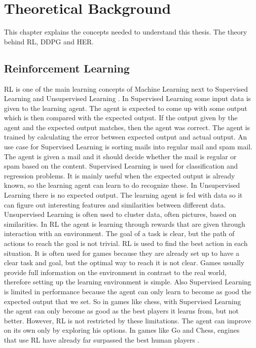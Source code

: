 \chapter{Theoretical Background}

This chapter explains the concepts needed to understand this thesis. The theory behind RL, DDPG and HER.

\section{Reinforcement Learning}

RL is one of the main learning concepts of Machine Learning next to Supervised Learning and Unsupervised Learning \cite{machinelearning}.
\newline
In Supervised Learning some input data is given to the learning agent. The agent is expected to come up with some output which is then compared with the expected output. If the output given by the agent and the expected output matches, then the agent was correct. The agent is trained by calculating the error between expected output and actual output. An use case for Supervised Learning is sorting mails into regular mail and spam mail. The agent is given a mail and it should decide whether the mail is regular or spam based on the content. Supervised Learning is used for classification and regression problems. It is mainly useful when the expected output is already known, so the learning agent can learn to do recognize these. 
\newline
In Unsupervised Learning there is no expected output. The learning agent is fed with data so it can figure out interesting features and similarities between different data. Unsupervised Learning is often used to cluster data, often pictures, based on similarities.
\newline
In RL the agent is learning through rewards that are given through interaction with an environment. The goal of a task is clear, but the path of actions to reach the goal is not trivial. RL is used to find the best action in each situation. It is often used for games because they are already set up to have a clear task and goal, but the optimal way to reach it is not clear. Games usually provide full information on the environment in contrast to the real world, therefore setting up the learning environment is simple. Also Supervised Learning is limited in performance because the agent can only learn to become as good the expected output that we set. So in games like chess, with Supervised Learning the agent can only become as good as the best players it learns from, but not better. However, RL is not restricted by these limitations. The agent can improve on its own only by exploring his options. In games like Go and Chess, engines that use RL have already far surpassed the best human players \cite{alphazero}. 

